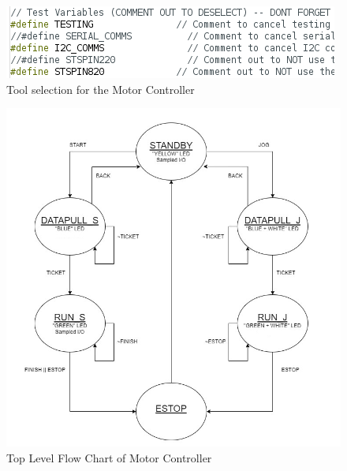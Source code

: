 \documentclass[journal]{IEEEtran}
\begin{document}
                
                
                
                \begin{figure}[H]
                    \centering
                    \includegraphics[scale = 0.55]{comments}
                    \caption{Tool selection for the Motor Controller}
                    \label{fig:comments}
                \end{figure}
                
                
                \begin{figure}[H]
                    \centering
                    \includegraphics[scale = 0.45]{Top_level_ver1}
                    \caption{Top Level Flow Chart of Motor Controller}
                    \label{fig:motor0}
                \end{figure}
                
                
                
\end{document}
